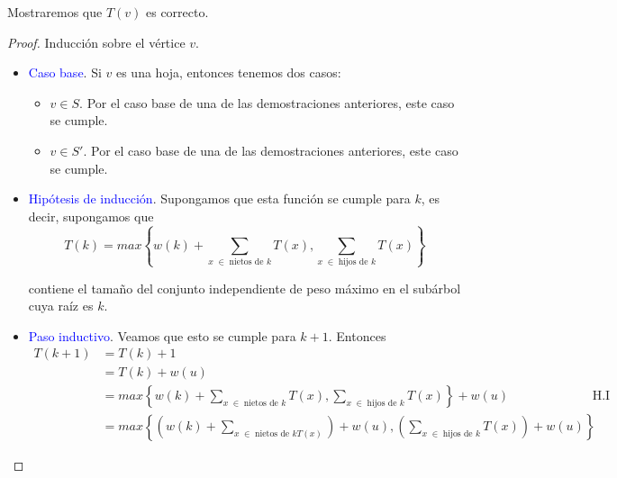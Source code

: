 \documentclass[letterpaper,11pt]{article}
\begin{document}
\begin{enumerate}
    Mostraremos que $T(v)$ es correcto.
    \begin{proof}
        Inducción sobre el vértice $v$. 
        \begin{itemize}
            \item \textcolor{blue}{Caso base}. Si $v$ es una hoja, entonces 
            tenemos dos casos:
            \begin{itemize}
                \item $v \in S$. Por el caso base de una de las demostraciones 
                anteriores, este caso se cumple.

                \item $v \in S'$. Por el caso base de una de las demostraciones
                anteriores, este caso se cumple.
            \end{itemize}

            \item \textcolor{blue}{Hipótesis de inducción}. Supongamos que 
            esta función se cumple para $k$, es decir, supongamos que 
            \begin{equation*}
                T(k) = max \left\{w(k) + \sum_{x \; \in \;
                \text{nietos de $k$}} T(x), \sum_{x \; \in \; 
                \text{hijos de $k$}} T(x) \right\} 
            \end{equation*}

            contiene el tamaño del conjunto independiente de peso máximo en 
            el subárbol cuya raíz es $k$.

            \item \textcolor{blue}{Paso inductivo}. Veamos que esto se cumple 
            para $k+1$. Entonces 
            \begin{align*}
                T(k+1) 
                &= T(k) + 1 \\
                &= T(k) + w(u) \\ 
                &= max \left\{w(k) + \sum_{x \; \in \; \text{nietos de $k$}} 
                T(x), \sum_{x \; \in \; \text{hijos de $k$}} T(x) \right\}
                + w(u)
                && \text{H.I} \\
                &= max \left\{
                    \left(w(k) + \sum_{x \; \in \; \text{nietos de $k$} T(x)} 
                    \right) + w(u), 
                    \left(\sum_{x \; \in \; \text{hijos de $k$}} T(x) \right)
                    + w(u) \right\}
            \end{align*}


\end{itemize}
\end{proof}
\end{enumerate}
\end{document}
